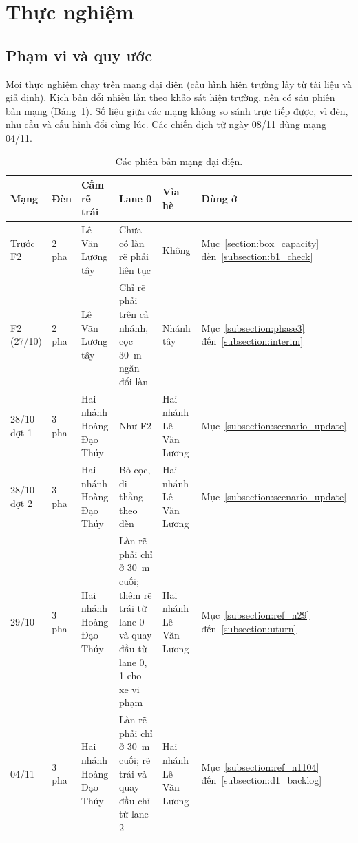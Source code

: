 \documentclass[../main.tex]{subfiles}
\begin{document}
\section{Thực nghiệm}
\label{section:experiments}

\subsection{Phạm vi và quy ước}
\label{subsection:net_versions}

Mọi thực nghiệm chạy trên mạng đại diện (cấu hình hiện trường lấy từ tài liệu và giả định). Kịch bản đổi nhiều lần theo khảo sát hiện trường, nên có sáu phiên bản mạng (Bảng~\ref{table:4.nets}). Số liệu giữa các mạng không so sánh trực tiếp được, vì đèn, nhu cầu và cấu hình đổi cùng lúc. Các chiến dịch từ ngày 08/11 dùng mạng 04/11.

\begin{table}[H]
\centering
\small\setlength{\tabcolsep}{3pt}
\caption{Các phiên bản mạng đại diện.} \label{table:4.nets}
\begin{tabular}{|p{2.0cm}|p{0.9cm}|p{2.3cm}|p{4.0cm}|p{2.2cm}|p{2.3cm}|}
\hline
\textbf{Mạng} & \textbf{Đèn} & \textbf{Cấm rẽ trái} & \textbf{Lane 0} & \textbf{Vỉa hè} & \textbf{Dùng ở} \\ \hline
Trước F2 & 2 pha & Lê Văn Lương tây & Chưa có làn rẽ phải liên tục & Không & Mục~\ref{section:box_capacity} đến~\ref{subsection:b1_check} \\ \hline
F2 (27/10) & 2 pha & Lê Văn Lương tây & Chỉ rẽ phải trên cả nhánh, cọc 30~m ngăn đổi làn & Nhánh tây & Mục~\ref{subsection:phase3} đến~\ref{subsection:interim} \\ \hline
28/10 đợt 1 & 3 pha & Hai nhánh Hoàng Đạo Thúy & Như F2 & Hai nhánh Lê Văn Lương & Mục~\ref{subsection:scenario_update} \\ \hline
28/10 đợt 2 & 3 pha & Hai nhánh Hoàng Đạo Thúy & Bỏ cọc, đi thẳng theo đèn & Hai nhánh Lê Văn Lương & Mục~\ref{subsection:scenario_update} \\ \hline
29/10 & 3 pha & Hai nhánh Hoàng Đạo Thúy & Làn rẽ phải chỉ ở 30~m cuối; thêm rẽ trái từ lane 0 và quay đầu từ lane 0, 1 cho xe vi phạm & Hai nhánh Lê Văn Lương & Mục~\ref{subsection:ref_n29} đến~\ref{subsection:uturn} \\ \hline
04/11 & 3 pha & Hai nhánh Hoàng Đạo Thúy & Làn rẽ phải chỉ ở 30~m cuối; rẽ trái và quay đầu chỉ từ lane 2 & Hai nhánh Lê Văn Lương & Mục~\ref{subsection:ref_n1104} đến~\ref{subsection:d1_backlog} \\ \hline
\end{tabular}
\end{table}
\end{document}

